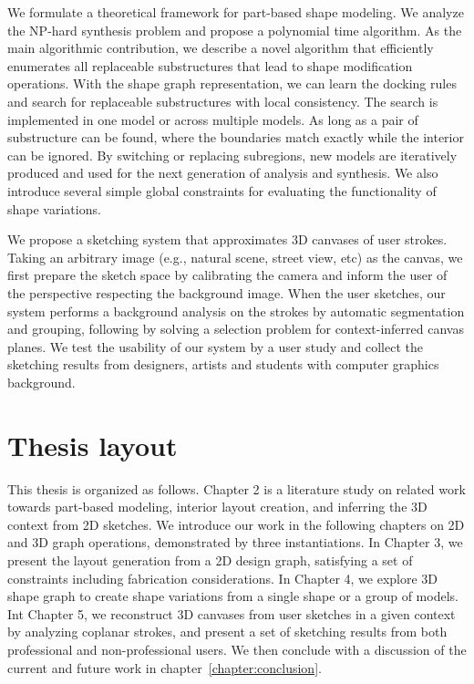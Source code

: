 We formulate a theoretical framework for part-based shape modeling. We analyze the NP-hard synthesis problem and propose a polynomial time algorithm. As the main algorithmic contribution, we describe a novel algorithm that efficiently enumerates all replaceable substructures that lead to shape modification operations. With the shape graph representation, we can learn the docking rules and search for replaceable substructures with local consistency. The search is implemented in one model or across multiple models. As long as a pair of substructure can be found, where the boundaries match exactly while the interior can be ignored. By switching or replacing subregions, new models are iteratively produced and used for the next generation of analysis and synthesis. We also introduce several simple global constraints for evaluating the functionality of shape variations.

We propose a sketching system that approximates 3D canvases of user strokes. Taking an arbitrary image (e.g., natural scene, street view, etc) as the canvas, we first prepare the sketch space by calibrating the camera and inform the user of the perspective respecting the background image. When the user sketches, our system performs a background analysis on the strokes by automatic segmentation and grouping, following by solving a selection problem for context-inferred canvas planes. We test the usability of our system by a user study and collect the sketching results from designers, artists and students with computer graphics background.

\section{Thesis layout}

This thesis is organized as follows. Chapter 2 is a literature study on related work towards part-based modeling, interior layout creation, and inferring the 3D context from 2D sketches. We introduce our work in the following chapters on 2D and 3D graph operations, demonstrated by three instantiations. In Chapter 3, we present the layout generation from a 2D design graph, satisfying a set of constraints including fabrication considerations. In Chapter 4, we explore 3D shape graph to create shape variations from a single shape or a group of models. Int Chapter 5, we reconstruct 3D canvases from user sketches in a given context by analyzing coplanar strokes, and present a set of sketching results from both professional and non-professional users. We then conclude with a discussion of the current and future work in chapter~\ref{chapter:conclusion}.
